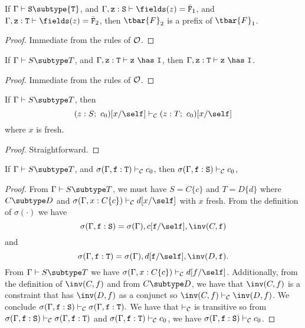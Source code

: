 \begin{lemma}
\label{lemmaone} %
If   $\Gamma \vdash {\tt S} \subtype {\tt T}$,
and  $\Gamma, {\tt z}: {\tt S} \vdash \fields(z) = \bar{\tt F}_1$,
and  $\Gamma, {\tt z}: {\tt T} \vdash \fields(z) = \bar{\tt F}_2$,
then $\tbar{F}_2$ is a prefix of $\tbar{F}_1$.
\end{lemma}

\begin{proof}
Immediate from the rules of $\cal O$.
\end{proof}

\begin{lemma}
\label{lemmatwo} %
If   $\Gamma \vdash S \subtype T$,
and  $\Gamma, {\tt z}: {\tt T} \vdash {\tt z}\ \has\ {\tt I}$,
then $\Gamma, {\tt z}: {\tt T} \vdash {\tt z}\ \has\ {\tt I}$.
\end{lemma}

\begin{proof}
Immediate from the rules of $\cal O$.
\end{proof}

\begin{lemma}
\label{existential-subtyping}
If   $\Gamma \vdash S \subtype T$,
then $$(z:S;~c_0)[x/\self] \vdash_{\cal C} (z:T;~c_0)[x/\self]$$
where $x$ is fresh.
\end{lemma}

\begin{proof}
Straightforward.
\end{proof}

\begin{lemma}
\label{lemmafour} %
If   $\Gamma \vdash S \subtype T$,
and  $\sigma(\Gamma,{\tt f}: {\tt T}) \vdash_{\cal C} c_0$,
then $\sigma(\Gamma,{\tt f}: {\tt S}) \vdash_{\cal C} c_0$,
\end{lemma}

\begin{proof}
From $\Gamma \vdash S \subtype T$,
we must have $S = C\{c\}$ and $T = D\{d\}$
where
$C \subtype D$
and
$\sigma(\Gamma, x: C\{c\}) \vdash_{\cal C} d[x/\self]$
with $x$ fresh.
From the definition of $\sigma(\cdot)$ we have
    $$\sigma(\Gamma,{\tt f}: {\tt S}) =
      \sigma(\Gamma), c[{\tt f}/\self], \inv(C,{\tt f})$$ and
    $$\sigma(\Gamma,{\tt f}: {\tt T}) =
      \sigma(\Gamma), d[{\tt f}/\self], \inv(D,{\tt f}).$$
From $\Gamma \vdash S \subtype T$ we have 
$\sigma(\Gamma, x: C\{c\}) \vdash_{\cal C} d[f/\self]$.
Additionally, from the definition of $\inv(C,f)$ and
from $C \subtype D$, 
we have that $\inv(C,f)$ is a constraint that has $\inv(D,f)$ as a conjunct so 
$\inv(C,f) \vdash_{\cal C} \inv(D,f)$.
We conclude
$\sigma(\Gamma,{\tt f}: {\tt S}) \vdash_{\cal C}
\sigma(\Gamma,{\tt f}: {\tt T}).$
We have that $\vdash_{\cal C}$ is transitive so 
from $\sigma(\Gamma,{\tt f}: {\tt S}) \vdash_{\cal C}
\sigma(\Gamma,{\tt f}: {\tt T})$
and
$\sigma(\Gamma,{\tt f}: {\tt T}) \vdash_{\cal C} c_0$,
we have 
$\sigma(\Gamma,{\tt f}: {\tt S}) \vdash_{\cal C} c_0$.
\end{proof}

